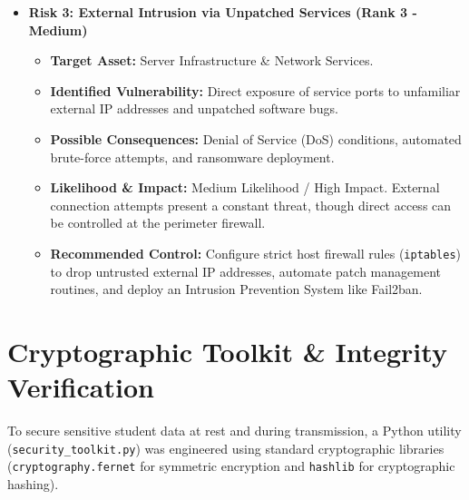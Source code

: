 \documentclass[12pt,a4paper]{article}
\begin{document}
\begin{itemize}[leftmargin=*, itemsep=0.2em]
    \item \textbf{Risk 3: External Intrusion via Unpatched Services (Rank 3 - Medium)}
    \begin{itemize}[label=$\circ$, leftmargin=1.5em]
        \item \textbf{Target Asset:} Server Infrastructure \& Network Services.
        \item \textbf{Identified Vulnerability:} Direct exposure of service ports to unfamiliar external IP addresses and unpatched software bugs.
        \item \textbf{Possible Consequences:} Denial of Service (DoS) conditions, automated brute-force attempts, and ransomware deployment.
        \item \textbf{Likelihood \& Impact:} Medium Likelihood / High Impact. External connection attempts present a constant threat, though direct access can be controlled at the perimeter firewall.
        \item \textbf{Recommended Control:} Configure strict host firewall rules (\texttt{iptables}) to drop untrusted external IP addresses, automate patch management routines, and deploy an Intrusion Prevention System like Fail2ban.
    \end{itemize}
\end{itemize}

\section{Cryptographic Toolkit \& Integrity Verification}

To secure sensitive student data at rest and during transmission, a Python utility (\texttt{security\_toolkit.py}) was engineered using standard cryptographic libraries (\texttt{cryptography.fernet} for symmetric encryption and \texttt{hashlib} for cryptographic hashing).
\end{document}

